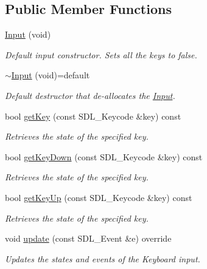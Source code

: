 \subsection*{Public Member Functions}
\begin{DoxyCompactItemize}
\item 
\hyperlink{classsparky_1_1_input_a359a2a7dfc51ad45f409286a7953fd48}{Input} (void)\hypertarget{classsparky_1_1_input_a359a2a7dfc51ad45f409286a7953fd48}{}\label{classsparky_1_1_input_a359a2a7dfc51ad45f409286a7953fd48}

\begin{DoxyCompactList}\small\item\em Default input constructor. Sets all the keys to false. \end{DoxyCompactList}\item 
\hyperlink{classsparky_1_1_input_a7babc46e74321c396aadbd323bf10f9c}{$\sim$\+Input} (void)=default\hypertarget{classsparky_1_1_input_a7babc46e74321c396aadbd323bf10f9c}{}\label{classsparky_1_1_input_a7babc46e74321c396aadbd323bf10f9c}

\begin{DoxyCompactList}\small\item\em Default destructor that de-\/allocates the \hyperlink{classsparky_1_1_input}{Input}. \end{DoxyCompactList}\item 
bool \hyperlink{classsparky_1_1_input_a0cf28585979bb8dee2a544d3687c9c68}{get\+Key} (const S\+D\+L\+\_\+\+Keycode \&key) const 
\begin{DoxyCompactList}\small\item\em Retrieves the state of the specified key. \end{DoxyCompactList}\item 
bool \hyperlink{classsparky_1_1_input_ae95936bfe31d55e21b2fd316d0c92419}{get\+Key\+Down} (const S\+D\+L\+\_\+\+Keycode \&key) const 
\begin{DoxyCompactList}\small\item\em Retrieves the state of the specified key. \end{DoxyCompactList}\item 
bool \hyperlink{classsparky_1_1_input_a0a9b219059e05efeef0ee2fdb06de635}{get\+Key\+Up} (const S\+D\+L\+\_\+\+Keycode \&key) const 
\begin{DoxyCompactList}\small\item\em Retrieves the state of the specified key. \end{DoxyCompactList}\item 
void \hyperlink{classsparky_1_1_input_abec7cd786dcc7b744b49ff7fcabec43f}{update} (const S\+D\+L\+\_\+\+Event \&e) override
\begin{DoxyCompactList}\small\item\em Updates the states and events of the Keyboard input. \end{DoxyCompactList}\end{DoxyCompactItemize}

